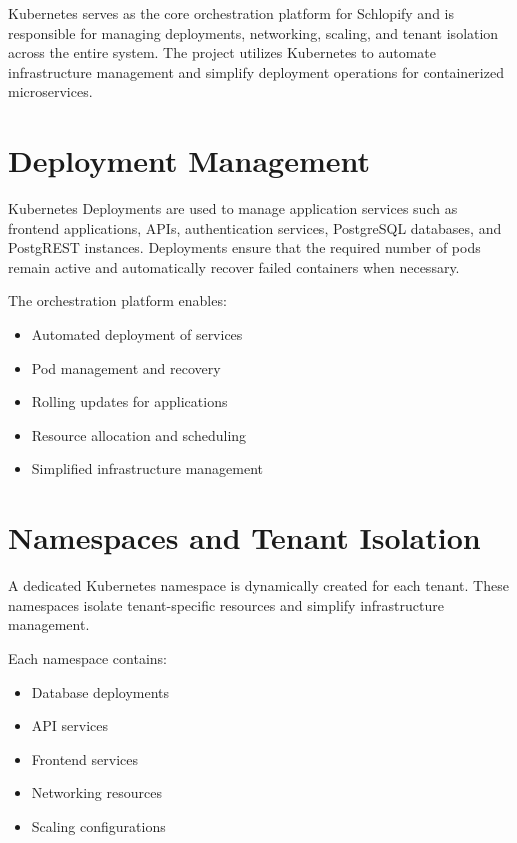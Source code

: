 \documentclass[12pt,a4paper]{report}
\begin{document}
Kubernetes serves as the core orchestration platform for Schlopify and is responsible for managing deployments, networking, scaling, and tenant isolation across the entire system. The project utilizes Kubernetes to automate infrastructure management and simplify deployment operations for containerized microservices.

\section{Deployment Management}

Kubernetes Deployments are used to manage application services such as frontend applications, APIs, authentication services, PostgreSQL databases, and PostgREST instances. Deployments ensure that the required number of pods remain active and automatically recover failed containers when necessary.

The orchestration platform enables:

\begin{itemize}

    \item Automated deployment of services
    \item Pod management and recovery
    \item Rolling updates for applications
    \item Resource allocation and scheduling
    \item Simplified infrastructure management

\end{itemize}

\section{Namespaces and Tenant Isolation}

A dedicated Kubernetes namespace is dynamically created for each tenant. These namespaces isolate tenant-specific resources and simplify infrastructure management.

Each namespace contains:

\begin{itemize}

    \item Database deployments
    \item API services
    \item Frontend services
    \item Networking resources
    \item Scaling configurations

\end{itemize}
\end{document}
